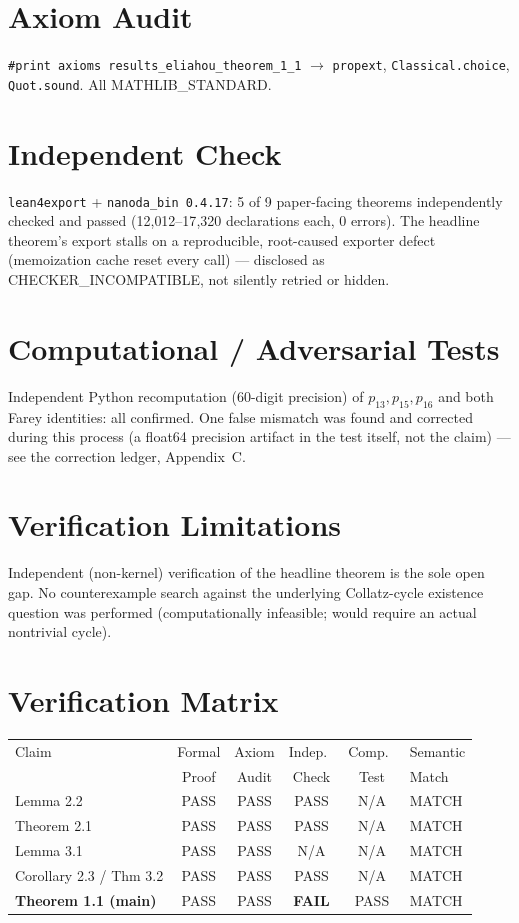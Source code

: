 \documentclass[11pt]{article}
\begin{document}
\section{Axiom Audit}
\texttt{\#print axioms results\_eliahou\_theorem\_1\_1} $\to$ \texttt{propext}, \texttt{Classical.choice}, \texttt{Quot.sound}. All MATHLIB\_STANDARD.

\section{Independent Check}
\texttt{lean4export} + \texttt{nanoda\_bin 0.4.17}: 5 of 9 paper-facing theorems independently checked and passed (12{,}012--17{,}320 declarations each, 0 errors). The headline theorem's export stalls on a reproducible, root-caused exporter defect (memoization cache reset every call) --- disclosed as CHECKER\_INCOMPATIBLE, not silently retried or hidden.

\section{Computational / Adversarial Tests}
Independent Python recomputation (60-digit precision) of $p_{13},p_{15},p_{16}$ and both Farey identities: all confirmed. One false mismatch was found and corrected during this process (a float64 precision artifact in the test itself, not the claim) --- see the correction ledger, Appendix~C.

\section{Verification Limitations}
Independent (non-kernel) verification of the headline theorem is the sole open gap. No counterexample search against the underlying Collatz-cycle existence question was performed (computationally infeasible; would require an actual nontrivial cycle).

\section{Verification Matrix}
\begin{center}
\small
\begin{tabular}{lccccl}
\toprule
Claim & Formal & Axiom & Indep.\ & Comp.\ & Semantic \\
      & Proof  & Audit & Check   & Test   & Match \\
\midrule
Lemma 2.2 & PASS & PASS & PASS & N/A & MATCH \\
Theorem 2.1 & PASS & PASS & PASS & N/A & MATCH \\
Lemma 3.1 & PASS & PASS & N/A & N/A & MATCH \\
Corollary 2.3 / Thm 3.2 & PASS & PASS & PASS & N/A & MATCH \\
\textbf{Theorem 1.1 (main)} & PASS & PASS & \textbf{FAIL} & PASS & MATCH \\
\bottomrule
\end{tabular}
\normalsize
\end{center}
\end{document}
